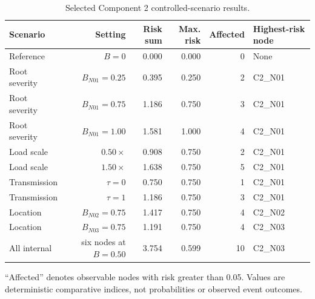 \begin{table}[H]
\centering
\caption{Selected Component 2 controlled-scenario results.}
\label{tab:electrical-component2-results}
\small
\renewcommand{\arraystretch}{1.08}
\begin{tabularx}{\textwidth}{@{}lrrrrL@{}}
\toprule
Scenario & Setting & Risk sum & Max. risk & Affected & Highest-risk node \\
\midrule
Reference & $B=0$ & 0.000 & 0.000 & 0 & None \\
Root severity & $B_{N01}=0.25$ & 0.395 & 0.250 & 2 & C2\_N01 \\
Root severity & $B_{N01}=0.75$ & 1.186 & 0.750 & 3 & C2\_N01 \\
Root severity & $B_{N01}=1.00$ & 1.581 & 1.000 & 4 & C2\_N01 \\
Load scale & $0.50\times$ & 0.908 & 0.750 & 2 & C2\_N01 \\
Load scale & $1.50\times$ & 1.638 & 0.750 & 5 & C2\_N01 \\
Transmission & $\tau=0$ & 0.750 & 0.750 & 1 & C2\_N01 \\
Transmission & $\tau=1$ & 1.186 & 0.750 & 3 & C2\_N01 \\
Location & $B_{N02}=0.75$ & 1.417 & 0.750 & 4 & C2\_N02 \\
Location & $B_{N03}=0.75$ & 1.191 & 0.750 & 4 & C2\_N03 \\
All internal & six nodes at $B=0.50$ & 3.754 & 0.599 & 10 & C2\_N03 \\
\bottomrule
\end{tabularx}
\vspace{2pt}\parbox{0.96\linewidth}{\footnotesize ``Affected'' denotes observable nodes with risk greater than 0.05. Values are deterministic comparative indices, not probabilities or observed event outcomes.}
\end{table}
